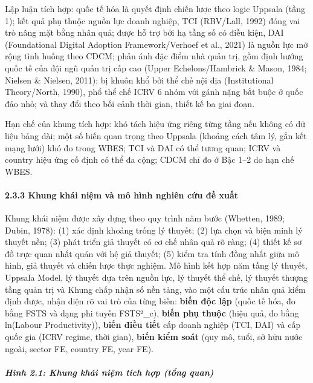 \documentclass[
  a4paper,
  13pt]{extreport}
\begin{document}
Lập luận tích hợp: quốc tế hóa là quyết định chiến lược theo logic
Uppsala (tầng 1); kết quả phụ thuộc nguồn lực doanh nghiệp, TCI
(RBV/Lall, 1992) đóng vai trò nâng mặt bằng nhân quả; được hỗ trợ bởi hạ
tầng số có điều kiện, DAI (Foundational Digital Adoption
Framework/Verhoef et al., 2021) là nguồn lực mở rộng tình huống theo
CDCM; phản ánh đặc điểm nhà quản trị, gồm định hướng quốc tế của đội ngũ
quản trị cấp cao (Upper Echelons/Hambrick \& Mason, 1984; Nielsen \&
Nielsen, 2011); bị khuôn khổ bởi thể chế nội địa (Institutional
Theory/North, 1990), phổ thể chế ICRV 6 nhóm với gánh nặng bắt buộc ở
quốc đảo nhỏ; và thay đổi theo bối cảnh thời gian, thiết kế ba giai
đoạn.

Hạn chế của khung tích hợp: khó tách hiệu ứng riêng từng tầng nếu không
có dữ liệu bảng dài; một số biến quan trọng theo Uppsala (khoảng cách
tâm lý, gắn kết mạng lưới) khó đo trong WBES; TCI và DAI có thể tương
quan; ICRV và country hiệu ứng cố định có thể đa cộng; CDCM chỉ đo ở Bậc
1--2 do hạn chế WBES.

\hypertarget{khung-khuxe1i-niux1ec7m-vuxe0-muxf4-huxecnh-nghiuxean-cux1ee9u-ux111ux1ec1-xuux1ea5t}{%
\paragraph{2.3.3 Khung khái niệm và mô hình nghiên cứu đề
xuất}\label{khung-khuxe1i-niux1ec7m-vuxe0-muxf4-huxecnh-nghiuxean-cux1ee9u-ux111ux1ec1-xuux1ea5t}}

Khung khái niệm được xây dựng theo quy trình năm bước (Whetten, 1989;
Dubin, 1978): (1) xác định khoảng trống lý thuyết; (2) lựa chọn và biện
minh lý thuyết nền; (3) phát triển giả thuyết có cơ chế nhân quả rõ
ràng; (4) thiết kế sơ đồ trực quan nhất quán với hệ giả thuyết; (5) kiểm
tra tính đồng nhất giữa mô hình, giả thuyết và chiến lược thực nghiệm.
Mô hình kết hợp năm tầng lý thuyết, Uppsala Model, lý thuyết dựa trên
nguồn lực, lý thuyết thể chế, lý thuyết thượng tầng quản trị và Khung
chấp nhận số nền tảng, vào một cấu trúc nhân quả kiểm định được, nhận
diện rõ vai trò của từng biến: \textbf{biến độc lập} (quốc tế hóa, đo
bằng FSTS và dạng phi tuyến FSTS²\_c), \textbf{biến phụ thuộc} (hiệu
quả, đo bằng ln(Labour Productivity)), \textbf{biến điều tiết} cấp doanh
nghiệp (TCI, DAI) và cấp quốc gia (ICRV regime, thời gian), \textbf{biến
kiểm soát} (quy mô, tuổi, sở hữu nước ngoài, sector FE, country FE, year
FE).

\hypertarget{huxecnh-2.1-khung-khuxe1i-niux1ec7m-tuxedch-hux1ee3p-tux1ed5ng-quan}{%
\subparagraph{Hình 2.1: Khung khái niệm tích hợp (tổng
quan)}\label{huxecnh-2.1-khung-khuxe1i-niux1ec7m-tuxedch-hux1ee3p-tux1ed5ng-quan}}
\end{document}
